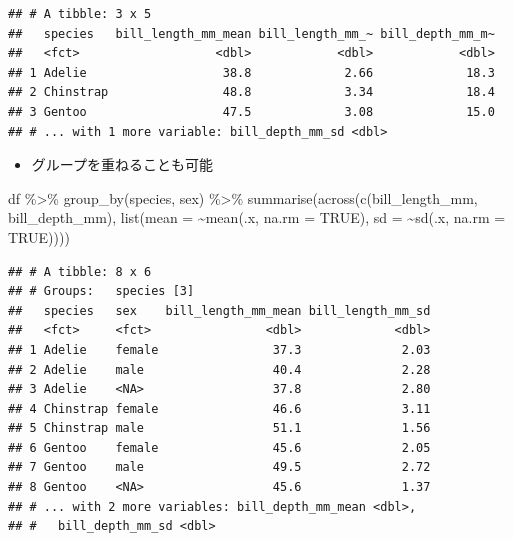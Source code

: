 \documentclass[
  xelatex,ja=standard, b5paper]{bxjsbook}
\newenvironment{Shaded}{\begin{snugshade}}{\end{snugshade}}
\newcommand{\AttributeTok}[1]{\textcolor[rgb]{0.77,0.63,0.00}{#1}}
\newcommand{\ConstantTok}[1]{\textcolor[rgb]{0.00,0.00,0.00}{#1}}
\newcommand{\FunctionTok}[1]{\textcolor[rgb]{0.00,0.00,0.00}{#1}}
\newcommand{\NormalTok}[1]{#1}
\newcommand{\SpecialCharTok}[1]{\textcolor[rgb]{0.00,0.00,0.00}{#1}}
\providecommand{\tightlist}{%
  \setlength{\itemsep}{0pt}\setlength{\parskip}{0pt}}
\begin{document}
\begin{verbatim}
## # A tibble: 3 x 5
##   species   bill_length_mm_mean bill_length_mm_~ bill_depth_mm_m~
##   <fct>                   <dbl>            <dbl>            <dbl>
## 1 Adelie                   38.8             2.66             18.3
## 2 Chinstrap                48.8             3.34             18.4
## 3 Gentoo                   47.5             3.08             15.0
## # ... with 1 more variable: bill_depth_mm_sd <dbl>
\end{verbatim}

\begin{itemize}
\tightlist
\item
  グループを重ねることも可能
\end{itemize}

\begin{Shaded}
\begin{Highlighting}[]
\NormalTok{df }\SpecialCharTok{\%\textgreater{}\%} 
  \FunctionTok{group\_by}\NormalTok{(species, sex) }\SpecialCharTok{\%\textgreater{}\%} 
  \FunctionTok{summarise}\NormalTok{(}\FunctionTok{across}\NormalTok{(}\FunctionTok{c}\NormalTok{(bill\_length\_mm, bill\_depth\_mm),}
                   \FunctionTok{list}\NormalTok{(}\AttributeTok{mean =} \SpecialCharTok{\textasciitilde{}}\FunctionTok{mean}\NormalTok{(.x, }\AttributeTok{na.rm =} \ConstantTok{TRUE}\NormalTok{),}
                        \AttributeTok{sd =} \SpecialCharTok{\textasciitilde{}}\FunctionTok{sd}\NormalTok{(.x, }\AttributeTok{na.rm =} \ConstantTok{TRUE}\NormalTok{))))}
\end{Highlighting}
\end{Shaded}

\begin{verbatim}
## # A tibble: 8 x 6
## # Groups:   species [3]
##   species   sex    bill_length_mm_mean bill_length_mm_sd
##   <fct>     <fct>                <dbl>             <dbl>
## 1 Adelie    female                37.3              2.03
## 2 Adelie    male                  40.4              2.28
## 3 Adelie    <NA>                  37.8              2.80
## 4 Chinstrap female                46.6              3.11
## 5 Chinstrap male                  51.1              1.56
## 6 Gentoo    female                45.6              2.05
## 7 Gentoo    male                  49.5              2.72
## 8 Gentoo    <NA>                  45.6              1.37
## # ... with 2 more variables: bill_depth_mm_mean <dbl>,
## #   bill_depth_mm_sd <dbl>
\end{verbatim}
\end{document}
